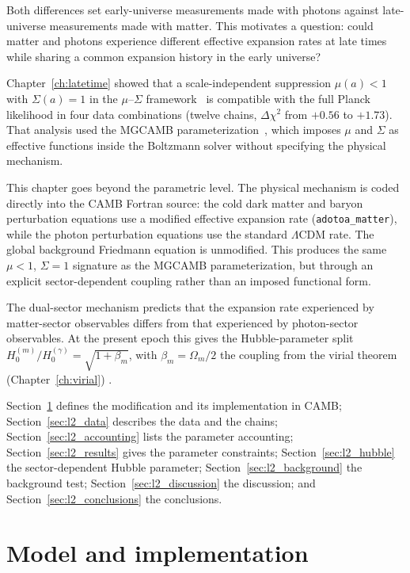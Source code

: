 Both differences set early-universe measurements made with photons against late-universe measurements made with matter. This motivates a question:
could matter and photons experience different effective expansion rates at late times while sharing a common expansion history in the early
universe?

Chapter~\ref{ch:latetime} showed that a scale-independent suppression $\mu(a)<1$ with $\Sigma(a)=1$ in the $\mu$--$\Sigma$
framework~\cite{PogosianSilvestri2016} is compatible with the full Planck likelihood in four data combinations (twelve chains, $\Delta\chi^2$ from
$+0.56$ to $+1.73$). That analysis used the MGCAMB parameterization~\cite{Wang2023MGCAMB}, which imposes $\mu$ and $\Sigma$ as effective functions
inside the Boltzmann solver without specifying the physical mechanism.

This chapter goes beyond the parametric level. The physical mechanism is coded directly into the CAMB Fortran source: the cold dark matter and baryon
perturbation equations use a modified effective expansion rate (\texttt{adotoa\_matter}), while the photon perturbation equations use the standard
$\Lambda$CDM rate. The global background Friedmann equation is unmodified. This produces the same $\mu<1$, $\Sigma=1$ signature as the MGCAMB
parameterization, but through an explicit sector-dependent coupling rather than an imposed functional form.

The dual-sector mechanism predicts that the expansion rate experienced by matter-sector observables differs from that experienced by photon-sector
observables. At the present epoch this gives the Hubble-parameter split $H_0^{(m)}/H_0^{(\gamma)}=\sqrt{1+\beta_m}$, with $\beta_m=\Omega_m/2$ the
coupling from the virial theorem (Chapter~\ref{ch:virial}) \derived.

Section~\ref{sec:l2_model} defines the modification and its implementation in CAMB; Section~\ref{sec:l2_data} describes the data and the chains;
Section~\ref{sec:l2_accounting} lists the parameter accounting; Section~\ref{sec:l2_results} gives the parameter constraints; Section~\ref{sec:l2_hubble}
the sector-dependent Hubble parameter; Section~\ref{sec:l2_background} the background test; Section~\ref{sec:l2_discussion} the discussion; and
Section~\ref{sec:l2_conclusions} the conclusions.

\section{Model and implementation}\label{sec:l2_model}

